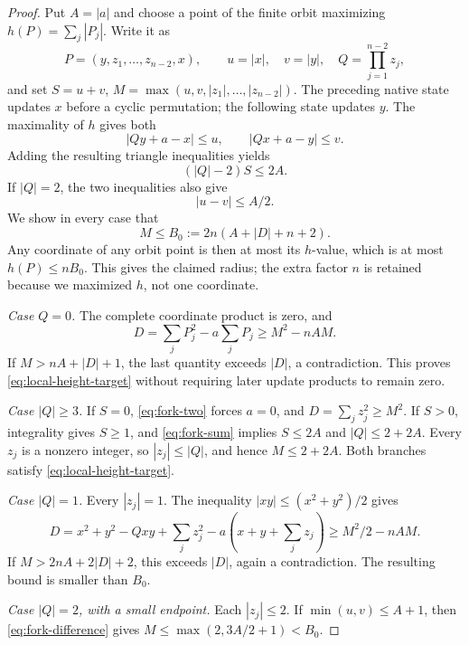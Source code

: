 \begin{proof}
Put $A=|a|$ and choose a point of the finite orbit maximizing
$h(P)=\sum_j|P_j|$. Write it as
\[
 P=(y,z_1,\ldots,z_{n-2},x),\qquad
 u=|x|,\quad v=|y|,\quad Q=\prod_{j=1}^{n-2}z_j,
\]
and set $S=u+v$, $M=\max(u,v,|z_1|,\ldots,|z_{n-2}|)$.
The preceding native state updates $x$ before a cyclic permutation;
the following state updates $y$. The maximality of $h$ gives both
\begin{equation}
 |Qy+a-x|\le u,\qquad |Qx+a-y|\le v.
 \label{eq:fork-two}
\end{equation}
Adding the resulting triangle inequalities yields
\begin{equation}
 (|Q|-2)S\le2A.
 \label{eq:fork-sum}
\end{equation}
If $|Q|=2$, the two inequalities also give
\begin{equation}
 |u-v|\le A/2.
 \label{eq:fork-difference}
\end{equation}
We show in every case that
\begin{equation}
 M\le B_0:=2n(A+|D|+n+2).
 \label{eq:local-height-target}
\end{equation}
Any coordinate of any orbit point is then at most its $h$-value,
which is at most $h(P)\le nB_0$. This gives the claimed radius;
the extra factor $n$ is retained because we maximized $h$, not
one coordinate.

\emph{Case $Q=0$.}
The complete coordinate product is zero, and
\[
 D=\sum_jP_j^2-a\sum_jP_j\ge M^2-nAM.
\]
If $M>nA+|D|+1$, the last quantity exceeds $|D|$, a
contradiction. This proves \eqref{eq:local-height-target} without
requiring later update products to remain zero.

\emph{Case $|Q|\ge3$.}
If $S=0$, \eqref{eq:fork-two} forces $a=0$, and
$D=\sum_jz_j^2\ge M^2$. If $S>0$, integrality gives $S\ge1$,
and \eqref{eq:fork-sum} implies $S\le2A$ and $|Q|\le2+2A$.
Every $z_j$ is a nonzero integer, so $|z_j|\le|Q|$, and hence
$M\le2+2A$. Both branches satisfy \eqref{eq:local-height-target}.

\emph{Case $|Q|=1$.}
Every $|z_j|=1$. The inequality $|xy|\le(x^2+y^2)/2$ gives
\[
 D=x^2+y^2-Qxy+\sum_jz_j^2-a\left(x+y+\sum_jz_j\right)
   \ge M^2/2-nAM.
\]
If $M>2nA+2|D|+2$, this exceeds $|D|$, again a contradiction.
The resulting bound is smaller than $B_0$.

\emph{Case $|Q|=2$, with a small endpoint.}
Each $|z_j|\le2$. If $\min(u,v)\le A+1$, then
\eqref{eq:fork-difference} gives
$M\le\max(2,3A/2+1)<B_0$.


\end{proof}
